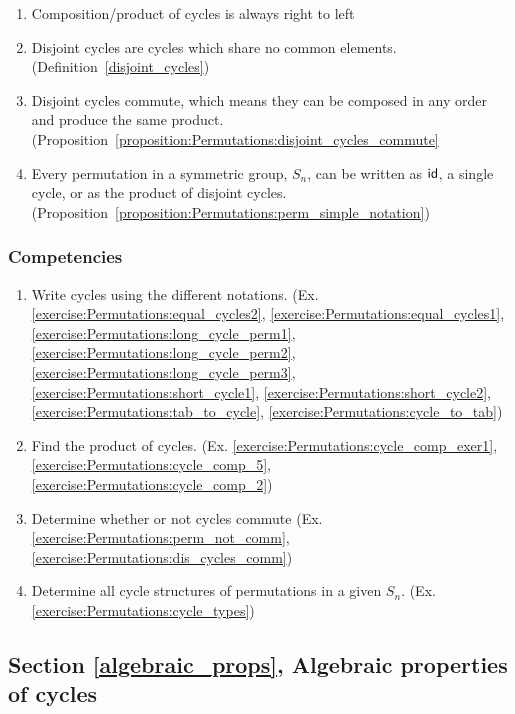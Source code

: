 \begin{enumerate}
\item
Composition/product of cycles is always right to left
\item
Disjoint cycles are cycles which share no common elements.  (Definition~\ref{disjoint_cycles})
\item
Disjoint cycles commute, which means they can be composed in any order and produce the same product. (Proposition~\ref{proposition:Permutations:disjoint_cycles_commute}
\item
Every permutation in a symmetric group, $S_n$, can be written as $\sf{id}$, a single cycle, or as the product of disjoint cycles. (Proposition~\ref{proposition:Permutations:perm_simple_notation})
\end{enumerate}

\subsubsection*{Competencies}
\begin{enumerate}
\item
Write cycles using the different notations.  (Ex. \ref{exercise:Permutations:equal_cycles2}, \ref{exercise:Permutations:equal_cycles1},  \ref{exercise:Permutations:long_cycle_perm1}, \ref{exercise:Permutations:long_cycle_perm2}, \ref{exercise:Permutations:long_cycle_perm3}, \ref{exercise:Permutations:short_cycle1}, \ref{exercise:Permutations:short_cycle2}, \ref{exercise:Permutations:tab_to_cycle}, \ref{exercise:Permutations:cycle_to_tab})
\item
Find the product of cycles.  (Ex. \ref{exercise:Permutations:cycle_comp_exer1}, \ref{exercise:Permutations:cycle_comp_5}, \ref{exercise:Permutations:cycle_comp_2})
\item
Determine whether or not cycles commute (Ex. \ref{exercise:Permutations:perm_not_comm}, \ref{exercise:Permutations:dis_cycles_comm})
\item
Determine all cycle structures of permutations in a given $S_n$. (Ex. \ref{exercise:Permutations:cycle_types})
\end{enumerate}


\subsection*{Section \ref{algebraic_props}, Algebraic properties of cycles}
